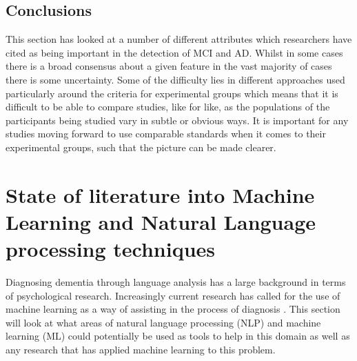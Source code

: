 \documentclass[10pt, letterpaper, twoside, openany]{book}
\begin{document}
\subsection{Conclusions}
This section has looked at a number of different attributes which researchers have cited as being important in the detection of MCI and AD. Whilst in some cases there is a broad consensus about a given feature in the vast majority of cases there is some uncertainty. Some of the difficulty lies in different approaches used particularly around the criteria for experimental groups which means that it is difficult to be able to compare studies, like for like, as the populations of the participants being studied vary in subtle or obvious ways. It is important for any studies moving forward to use comparable standards when it comes to their experimental groups, such that the picture can be made clearer.

\section{State of literature into Machine Learning and Natural Language processing techniques}
Diagnosing dementia through language analysis has a large background in terms of psychological research. Increasingly current research has called for the use of machine learning as a way of assisting in the process of diagnosis \cite{Orimaye2017, Boschi2017}. This section will look at what areas of natural language processing (NLP) and machine learning (ML) could potentially be used as tools to help in this domain as well as any research that has applied machine learning to this problem.
\end{document}
